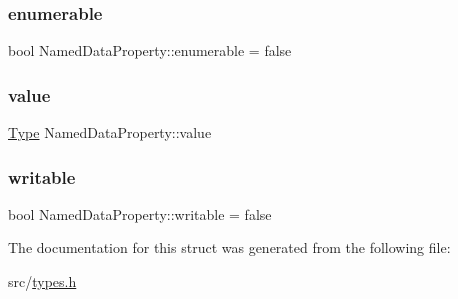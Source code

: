 \subsubsection{\texorpdfstring{enumerable}{enumerable}}
{\footnotesize\ttfamily bool Named\+Data\+Property\+::enumerable = false}

\mbox{\label{struct_named_data_property_a24c2a352d9e584c219ee0f9f6aaeb34e}} 
\subsubsection{\texorpdfstring{value}{value}}
{\footnotesize\ttfamily \hyperlink{types_8h_a742f51ca48e5d91bd1430409106f245d}{Type} Named\+Data\+Property\+::value}

\mbox{\label{struct_named_data_property_a83f0bc6d87115a6c14f4644eac90c3e7}} 
\subsubsection{\texorpdfstring{writable}{writable}}
{\footnotesize\ttfamily bool Named\+Data\+Property\+::writable = false}



The documentation for this struct was generated from the following file\+:\begin{DoxyCompactItemize}
\item 
src/\hyperlink{types_8h}{types.\+h}\end{DoxyCompactItemize}
